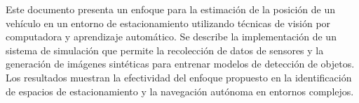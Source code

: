 \noindent
Este documento presenta un enfoque para la estimación de la posición de un vehículo en un entorno de estacionamiento
utilizando técnicas de visión por computadora y aprendizaje automático. Se describe la implementación de un sistema
de simulación que permite la recolección de datos de sensores y la generación de imágenes sintéticas para entrenar 
modelos de detección de objetos. Los resultados muestran la efectividad del enfoque propuesto en la identificación de 
espacios de estacionamiento y la navegación autónoma en entornos complejos.